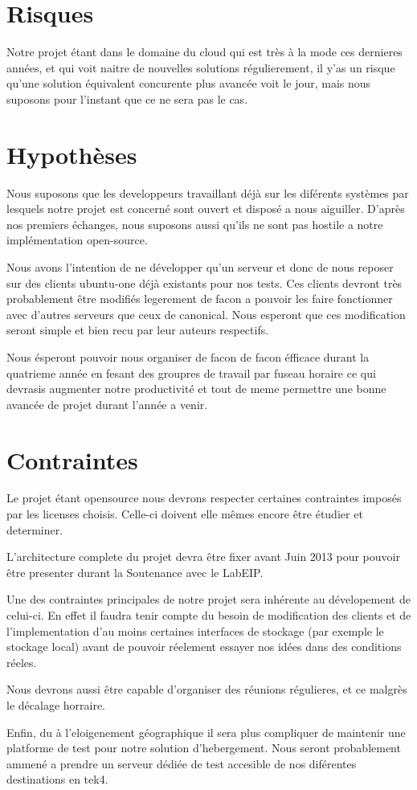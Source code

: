 \section{Risques}
Notre projet étant dans le domaine du cloud qui est très à la mode ces dernieres années, et qui voit naitre de nouvelles solutions régulierement, il y'as un risque qu'une solution équivalent concurente plus avancée voit le jour, mais nous suposons pour l'instant que ce ne sera pas le cas.

\section{Hypothèses}
Nous suposons que les developpeurs travaillant déjà sur les diférents systèmes par lesquels notre projet est concerné sont ouvert et disposé a nous aiguiller. D'après nos premiers échanges, nous suposons aussi qu'ils ne sont pas hostile a notre implémentation open-source.

Nous avons l'intention de ne développer qu'un serveur et donc de nous reposer sur des clients ubuntu-one déjà existants pour nos tests. Ces clients devront très probablement être modifiés legerement de facon a pouvoir les faire fonctionner avec d'autres serveurs que ceux de canonical. Nous esperont que ces modification seront simple et bien recu par leur auteurs respectifs.

Nous ésperont pouvoir nous organiser de facon de facon éfficace durant la quatrieme année en fesant des groupres de travail par fuseau horaire ce qui devrasis augmenter notre productivité et tout de meme permettre une bonne avancée de projet durant l'année a venir.

\section{Contraintes}
Le projet étant opensource nous devrons respecter certaines contraintes imposés par les licenses choisis. Celle-ci doivent elle mêmes encore être étudier et determiner.

L'architecture complete du projet devra être fixer avant Juin 2013 pour pouvoir être presenter durant la Soutenance avec le LabEIP.

Une des contraintes principales de notre projet sera inhérente au dévelopement de celui-ci. En effet il faudra tenir compte du besoin de modification des clients et de l'implementation d'au moins certaines interfaces de stockage (par exemple le stockage local) avant de pouvoir réelement essayer nos idées dans des conditions réeles.

Nous devrons aussi être capable d'organiser des réunions régulieres, et ce malgrès le décalage horraire.

Enfin, du à l'eloigenement géographique il sera plus compliquer de maintenir une platforme de test pour notre solution d'hebergement. Nous seront probablement ammené a prendre un serveur dédiée de test accesible de nos diférentes destinations en tek4.

